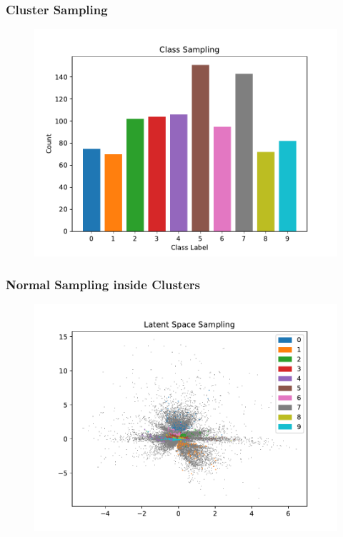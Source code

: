 \documentclass[10pt, usenames, dvipsnames, table]{beamer}
\begin{document}
\begin{frame}
  \frametitle{Cluster Sampling}
  \begin{figure}
    \centering
    \includegraphics[width=\linewidth]
    {models/mnist_conv_e300_L2_b64/uniform-cluster_sampling_distribution_1000}
    \caption{}
    \label{}
  \end{figure}
\end{frame}

\begin{frame}
  \frametitle{Normal Sampling inside Clusters}
  \begin{figure}
    \centering
    \includegraphics[width=\linewidth]
    {models/mnist_conv_e300_L2_b64/multi-normal-cluster_sampling_1000}
    \caption{}
    \label{}
  \end{figure}
\end{frame}
\end{document}
